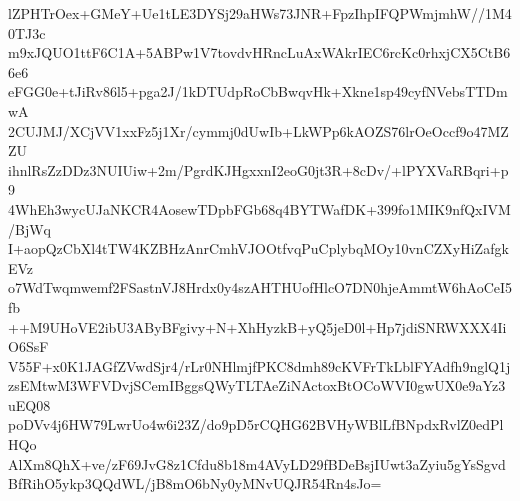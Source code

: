 lZPHTrOex+GMeY+Ue1tLE3DYSj29aHWs73JNR+FpzIhpIFQPWmjmhW//1M40TJ3c
m9xJQUO1ttF6C1A+5ABPw1V7tovdvHRncLuAxWAkrIEC6rcKc0rhxjCX5CtB66e6
eFGG0e+tJiRv86l5+pga2J/1kDTUdpRoCbBwqvHk+Xkne1sp49cyfNVebsTTDmwA
2CUJMJ/XCjVV1xxFz5j1Xr/cymmj0dUwIb+LkWPp6kAOZS76lrOeOccf9o47MZZU
ihnlRsZzDDz3NUIUiw+2m/PgrdKJHgxxnI2eoG0jt3R+8cDv/+lPYXVaRBqri+p9
4WhEh3wycUJaNKCR4AosewTDpbFGb68q4BYTWafDK+399fo1MIK9nfQxIVM/BjWq
I+aopQzCbXl4tTW4KZBHzAnrCmhVJOOtfvqPuCplybqMOy10vnCZXyHiZafgkEVz
o7WdTwqmwemf2FSastnVJ8Hrdx0y4szAHTHUofHlcO7DN0hjeAmmtW6hAoCeI5fb
++M9UHoVE2ibU3AByBFgivy+N+XhHyzkB+yQ5jeD0l+Hp7jdiSNRWXXX4IiO6SsF
V55F+x0K1JAGfZVwdSjr4/rLr0NHlmjfPKC8dmh89cKVFrTkLblFYAdfh9nglQ1j
zsEMtwM3WFVDvjSCemIBggsQWyTLTAeZiNActoxBtOCoWVI0gwUX0e9aYz3uEQ08
poDVv4j6HW79LwrUo4w6i23Z/do9pD5rCQHG62BVHyWBlLfBNpdxRvlZ0edPlHQo
AlXm8QhX+ve/zF69JvG8z1Cfdu8b18m4AVyLD29fBDeBsjIUwt3aZyiu5gYsSgvd
BfRihO5ykp3QQdWL/jB8mO6bNy0yMNvUQJR54Rn4sJo=
